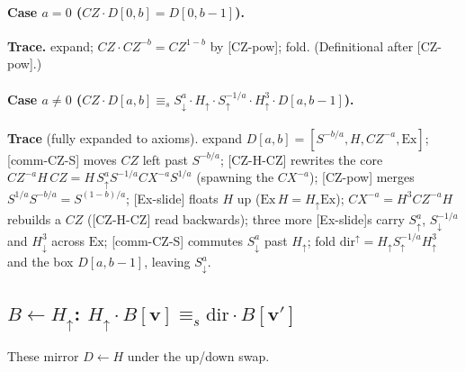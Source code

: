 \documentclass[a4paper]{article}
\newcommand{\lem}[1]{\textsf{[#1]}}      %
\begin{document}
\paragraph{Case $a=0$ \;($CZ\cdot D[0,b]=D[0,b-1]$).}\label{sub:czd0b}
\begin{center}\end{center}
\textbf{Trace.} expand; $CZ\cdot CZ^{-b}=CZ^{1-b}$ by \lem{CZ-pow}; fold. (Definitional after \lem{CZ-pow}.)

\paragraph{Case $a\neq0$ \;($CZ\cdot D[a,b]\equiv_s S^a_\downarrow\cdot H_\uparrow\cdot S^{-1/a}_\uparrow\cdot H^3_\uparrow\cdot D[a,b-1]$).}\label{sub:czdab}
\begin{center}\end{center}
\newpage
\begin{center}\end{center}
\textbf{Trace} (fully expanded to axioms).
expand $D[a,b]=[S^{-b/a},H,CZ^{-a},\mathrm{Ex}]$;
\lem{comm-CZ-S} moves $CZ$ left past $S^{-b/a}$;
\lem{CZ-H-CZ} rewrites the core $CZ^{-a}H\,CZ = H\,S^{a}_\uparrow S^{-1/a}CX^{-a}S^{1/a}$ (spawning the $CX^{-a}$);
\lem{CZ-pow} merges $S^{1/a}S^{-b/a}=S^{(1-b)/a}$;
\lem{Ex-slide} floats $H$ up ($\mathrm{Ex}\,H=H_\uparrow\mathrm{Ex}$);
$CX^{-a}=H^3 CZ^{-a}H$ rebuilds a $CZ$ (\lem{CZ-H-CZ} read backwards);
three more \lem{Ex-slide}s carry $S^{a}_\uparrow$, $S^{-1/a}_\downarrow$ and $H^3_\downarrow$ across $\mathrm{Ex}$;
\lem{comm-CZ-S} commutes $S^{a}_\downarrow$ past $H_\uparrow$;
fold $\mathrm{dir}^{\uparrow}=H_\uparrow S^{-1/a}_\uparrow H^3_\uparrow$ and the box $D[a,b-1]$, leaving $S^{a}_\downarrow$.

\subsection{$B\leftarrow H_\uparrow$: \; $H_\uparrow\cdot B[\mathbf v]\equiv_s \mathrm{dir}\cdot B[\mathbf v']$}
\begin{center}\end{center}
These mirror $D\leftarrow H$ under the up/down swap.
\end{document}
